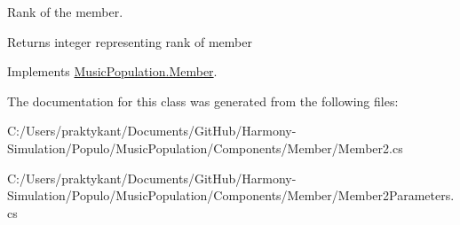 Rank of the member. 

\begin{DoxyReturn}{Returns}
integer representing rank of member
\end{DoxyReturn}


Implements \hyperlink{class_music_population_1_1_member_a238549ad669c4f8eda036e608beba422}{Music\+Population.\+Member}.



The documentation for this class was generated from the following files\+:\begin{DoxyCompactItemize}
\item 
C\+:/\+Users/praktykant/\+Documents/\+Git\+Hub/\+Harmony-\/\+Simulation/\+Populo/\+Music\+Population/\+Components/\+Member/Member2.\+cs\item 
C\+:/\+Users/praktykant/\+Documents/\+Git\+Hub/\+Harmony-\/\+Simulation/\+Populo/\+Music\+Population/\+Components/\+Member/Member2\+Parameters.\+cs\end{DoxyCompactItemize}
